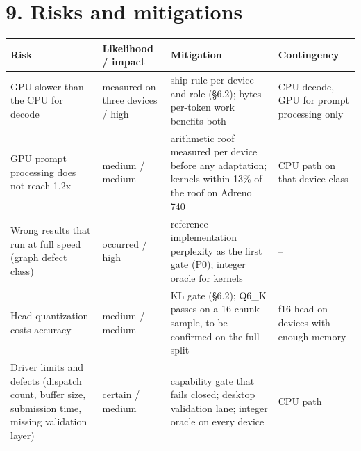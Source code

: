\documentclass[
  10pt,
]{article}
\newcounter{none} %
\begin{document}
\section{9. Risks and mitigations}\label{risks-and-mitigations}

{\def\LTcaptype{none} %
\begin{longtable}[]{@{}
  >{\raggedright\arraybackslash}p{}
  >{\raggedright\arraybackslash}p{}
  >{\raggedright\arraybackslash}p{}
  >{\raggedright\arraybackslash}p{}@{}}
\toprule\noalign{}
\begin{minipage}[b]{\linewidth}\raggedright%
Risk
\end{minipage} & \begin{minipage}[b]{\linewidth}\raggedright%
Likelihood / impact
\end{minipage} & \begin{minipage}[b]{\linewidth}\raggedright%
Mitigation
\end{minipage} & \begin{minipage}[b]{\linewidth}\raggedright%
Contingency
\end{minipage} \\
\midrule\noalign{}
\endhead%
\bottomrule\noalign{}
\endlastfoot%
GPU slower than the CPU for decode & measured on three devices / high &
ship rule per device and role (\S{}6.2); bytes-per-token work benefits both
& CPU decode, GPU for prompt processing only \\
GPU prompt processing does not reach 1.2x & medium / medium & arithmetic
roof measured per device before any adaptation; kernels within 13\% of
the roof on Adreno 740 & CPU path on that device class \\
Wrong results that run at full speed (graph defect class) & occurred /
high & reference-implementation perplexity as the first gate (P0);
integer oracle for kernels & -- \\
Head quantization costs accuracy & medium / medium & KL gate (\S{}6.2);
Q6\_K passes on a 16-chunk sample, to be confirmed on the full split &
f16 head on devices with enough memory \\
Driver limits and defects (dispatch count, buffer size, submission time,
missing validation layer) & certain / medium & capability gate that
fails closed; desktop validation lane; integer oracle on every device &
CPU path \\

\end{longtable}}
\end{document}
